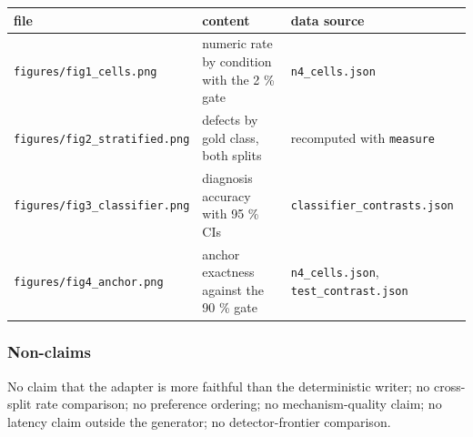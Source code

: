 \documentclass[
  10pt,
]{article}
\begin{document}
\begin{longtable}[]{@{}
  >{\raggedright\arraybackslash}p{}
  >{\raggedright\arraybackslash}p{}
  >{\raggedright\arraybackslash}p{}@{}}
\toprule\noalign{}
\begin{minipage}[b]{\linewidth}\raggedright
file
\end{minipage} & \begin{minipage}[b]{\linewidth}\raggedright
content
\end{minipage} & \begin{minipage}[b]{\linewidth}\raggedright
data source
\end{minipage} \\
\midrule\noalign{}
\endhead
\bottomrule\noalign{}
\endlastfoot
\texttt{figures/\allowbreak{}fig1\_\allowbreak{}cells.png} & numeric rate by condition with the 2
\% gate & \texttt{n4\_cells.json} \\
\texttt{figures/\allowbreak{}fig2\_\allowbreak{}stratified.png} & defects by gold class, both
splits & recomputed with \texttt{measure} \\
\texttt{figures/\allowbreak{}fig3\_\allowbreak{}classifier.png} & diagnosis accuracy with 95 \%
CIs & \texttt{classifier\_contrasts.json} \\
\texttt{figures/\allowbreak{}fig4\_\allowbreak{}anchor.png} & anchor exactness against the 90 \%
gate & \texttt{n4\_cells.json}, \texttt{test\_contrast.json} \\
\end{longtable}

\subsubsection{Non-claims}\label{non-claims}

No claim that the adapter is more faithful than the deterministic
writer; no cross-split rate comparison; no preference ordering; no
mechanism-quality claim; no latency claim outside the generator; no
detector-frontier comparison.


\end{document}
